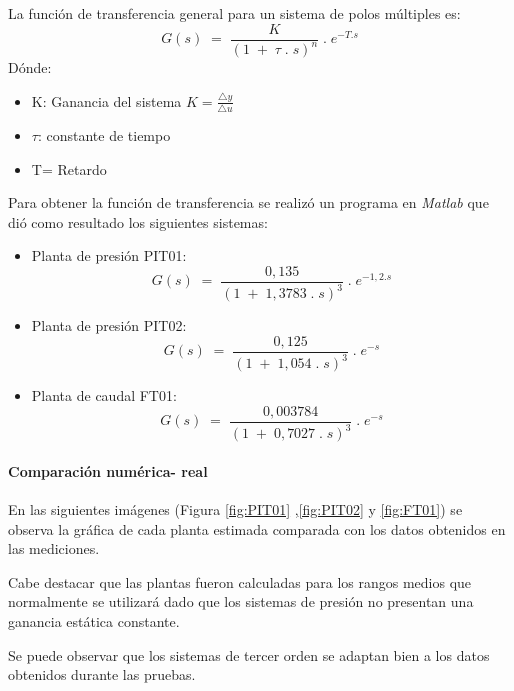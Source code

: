 {La función de transferencia general para un sistema de polos múltiples es:
\begin{equation}
	G(s)\;=\;\frac K{(1\;+\;\tau\;.\;s)^n}\;.\;e^{-T.s}
\end{equation}
Dónde:
\begin{itemize}
	\item K:  Ganancia del sistema $K = \frac{\triangle y}{\triangle u}$
	\item $\tau$: constante de tiempo
	\item T= Retardo
\end{itemize}

Para obtener la función de transferencia se realizó un programa en \textit{Matlab} que dió como resultado los siguientes sistemas:
\begin{itemize}
	\item Planta de presión PIT01:
	\begin{equation}
	 G(s)\;=\;\frac {0,135}{(1\;+\;1,3783\;.\;s)^3}\;.\;e^{-1,2.s}
	\end{equation}
	\item Planta de presión PIT02: 	
	\begin{equation}
		G(s)\;=\;\frac {0,125}{(1\;+\;1,054\;.\;s)^3}\;.\;e^{-s}
	\end{equation}
	\item Planta de caudal FT01:
		\begin{equation}
		G(s)\;=\;\frac {0,003784}{(1\;+\;0,7027\;.\;s)^3}\;.\;e^{-s}
	\end{equation}
\end{itemize}

\paragraph{Comparación numérica- real}
En las siguientes imágenes (Figura \ref{fig:PIT01} ,\ref{fig:PIT02} y \ref{fig:FT01}) se observa la gráfica de cada planta estimada comparada con los datos obtenidos en las mediciones.
\begin{comment}
$C:\Users\glori\Desktop\DANIELA\VISUAL_DANI\Automa\MATLAB\Prueba_PLANTA\Imaagenes Calculo Plantas\FIT001
Strenj_RESPUESTA.png$
\end{comment}

Cabe destacar que las plantas fueron calculadas para los rangos medios que normalmente se utilizará dado que los sistemas de presión no presentan una ganancia estática constante.

Se puede observar que los sistemas de tercer orden se adaptan bien a los datos obtenidos durante las pruebas.
\begin{comment}
no borrar opr las dudas que quisimos poner esto
 

\end{comment}}
